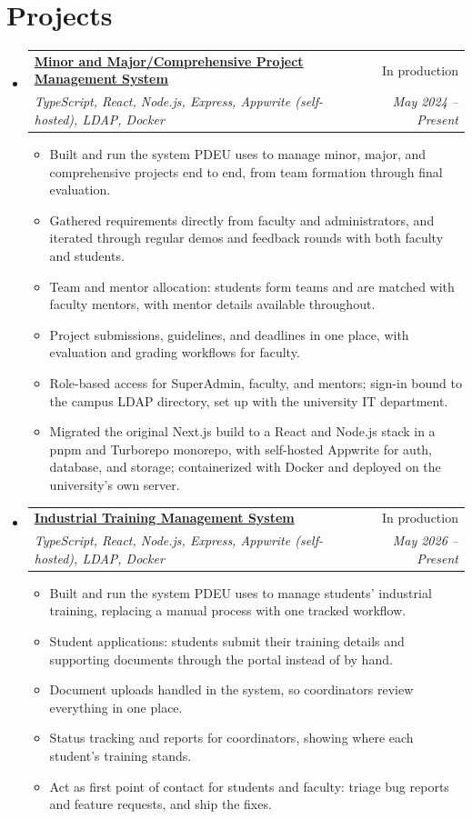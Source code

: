 \documentclass[a4paper,11pt]{article}
\makeatletter
\newcommand{\resumeSubheadingFull}[4]{
  \vspace{-1pt}\item
    \begin{tabular*}{0.97\textwidth}{l@{\extracolsep{\fill}}r}
    \textbf{#1} & #2 \\
    \textit{#3} & \textit{#4} \\
    \end{tabular*}\vspace{-5pt}
}
\newcommand{\resumeSubHeadingListStart}{\begin{itemize}[leftmargin=*]}
\newcommand{\resumeSubHeadingListEnd}{\end{itemize}}
\newcommand{\resumeItemListStart}{\begin{itemize}[itemsep=1pt,topsep=3pt]\small}
\newcommand{\resumeItemListEnd}{\end{itemize}\vspace{-3pt}}
\makeatother
\begin{document}
\section{Projects}
  \resumeSubHeadingListStart
    \resumeSubheadingFull{\href{https://portal.pdpu.ac.in}{Minor and Major/Comprehensive Project Management System}}{In production}
      {TypeScript, React, Node.js, Express, Appwrite (self-hosted), LDAP, Docker}{May 2024 -- Present}
      \resumeItemListStart
        \item Built and run the system PDEU uses to manage minor, major, and comprehensive projects end to end, from team formation through final evaluation.
        \item Gathered requirements directly from faculty and administrators, and iterated through regular demos and feedback rounds with both faculty and students.
        \item Team and mentor allocation: students form teams and are matched with faculty mentors, with mentor details available throughout.
        \item Project submissions, guidelines, and deadlines in one place, with evaluation and grading workflows for faculty.
        \item Role-based access for SuperAdmin, faculty, and mentors; sign-in bound to the campus LDAP directory, set up with the university IT department.
        \item Migrated the original Next.js build to a React and Node.js stack in a pnpm and Turborepo monorepo, with self-hosted Appwrite for auth, database, and storage; containerized with Docker and deployed on the university's own server.
      \resumeItemListEnd

    \resumeSubheadingFull{\href{https://portal.pdpu.ac.in}{Industrial Training Management System}}{In production}
      {TypeScript, React, Node.js, Express, Appwrite (self-hosted), LDAP, Docker}{May 2026 -- Present}
      \resumeItemListStart
        \item Built and run the system PDEU uses to manage students' industrial training, replacing a manual process with one tracked workflow.
        \item Student applications: students submit their training details and supporting documents through the portal instead of by hand.
        \item Document uploads handled in the system, so coordinators review everything in one place.
        \item Status tracking and reports for coordinators, showing where each student's training stands.
        \item Act as first point of contact for students and faculty: triage bug reports and feature requests, and ship the fixes.
      \resumeItemListEnd
  \resumeSubHeadingListEnd
\end{document}
